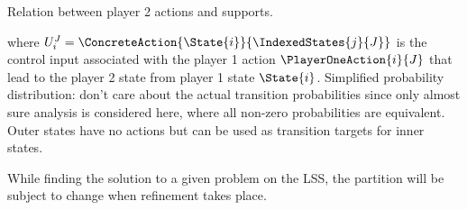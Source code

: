 Relation between player 2 actions and supports.

where $U_i^J = \ConcreteAction{\State{i}}{\IndexedStates{j}{J}}$ is the control input associated with the player 1 action $\PlayerOneAction{i}{J}$ that lead to the player 2 state from player 1 state $\State{i}$.
Simplified probability distribution: don't care about the actual transition probabilities since only almost sure analysis is considered here, where all non-zero probabilities are equivalent.
Outer states have no actions but can be used as transition targets for inner states.

While finding the solution to a given problem on the LSS, the partition will be subject to change when refinement takes place.

